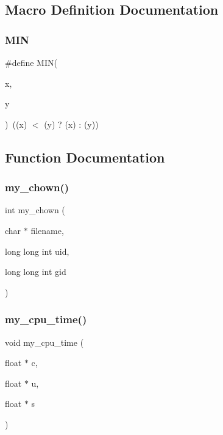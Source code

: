 \subsection{Macro Definition Documentation}
\mbox{\label{C-M__system_8c_a74e75242132eaabbc1c512488a135926}} 
\subsubsection{\texorpdfstring{M\+IN}{MIN}}
{\footnotesize\ttfamily \#define M\+IN(\begin{DoxyParamCaption}\item[{}]{x,  }\item[{}]{y }\end{DoxyParamCaption})~((x) $<$ (y) ? (x) \+: (y))}



\subsection{Function Documentation}
\mbox{\label{C-M__system_8c_acfa12de4342c03519fc35d7892db94b2}} 
\subsubsection{\texorpdfstring{my\+\_\+chown()}{my\_chown()}}
{\footnotesize\ttfamily int my\+\_\+chown (\begin{DoxyParamCaption}\item[{char $\ast$}]{filename,  }\item[{long long int}]{uid,  }\item[{long long int}]{gid }\end{DoxyParamCaption})}

\mbox{\label{C-M__system_8c_aae18c27a21f7c4aed7328460a7edb34c}} 
\subsubsection{\texorpdfstring{my\+\_\+cpu\+\_\+time()}{my\_cpu\_time()}}
{\footnotesize\ttfamily void my\+\_\+cpu\+\_\+time (\begin{DoxyParamCaption}\item[{float $\ast$}]{c,  }\item[{float $\ast$}]{u,  }\item[{float $\ast$}]{s }\end{DoxyParamCaption})}

